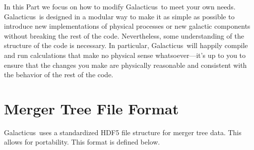 \documentclass[letterpaper,10pt]{book}
\def\glc{{\sc Galacticus}}
\begin{document}
In this Part we focus on how to modify \glc\ to meet your own needs. \glc\ is designed in a modular way to make it as simple as possible to introduce new implementations of physical processes or new galactic components without breaking the rest of the code. Nevertheless, some understanding of the structure of the code is necessary. In particular, \glc\ will happily compile and run calculations that make no physical sense whatsoever---it's up to you to ensure that the changes you make are physically reasonable and consistent with the behavior of the rest of the code.









\backmatter

\appendix

\chapter{Merger Tree File Format}\label{sec:MergerTreeFileFormat}

\glc\ uses a standardized HDF5 file structure for merger tree data. This allows for portability. This format is defined below.








\citeindextrue
\printindex
\end{document}
